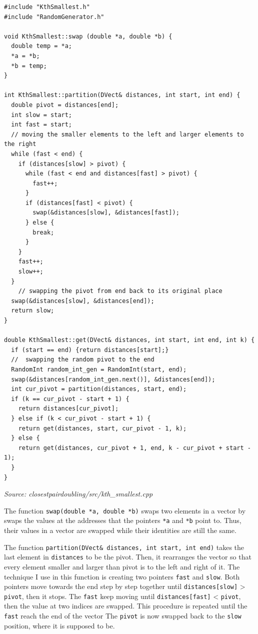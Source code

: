 \documentclass[12pt,english,]{article}
\newcommand{\code}[1]{\colorbox{light-gray}{\texttt{#1}}}
\begin{document}
\begin{lstlisting}
#include "KthSmallest.h"
#include "RandomGenerator.h"

void KthSmallest::swap (double *a, double *b) {
  double temp = *a;
  *a = *b;
  *b = temp;
}

int KthSmallest::partition(DVect& distances, int start, int end) {
  double pivot = distances[end];
  int slow = start;
  int fast = start;
  // moving the smaller elements to the left and larger elements to the right
  while (fast < end) {
    if (distances[slow] > pivot) {
      while (fast < end and distances[fast] > pivot) {
        fast++;
      }
      if (distances[fast] < pivot) {
        swap(&distances[slow], &distances[fast]);
      } else {
        break;
      }
    }
    fast++;
    slow++;
  }
    // swapping the pivot from end back to its original place
  swap(&distances[slow], &distances[end]);
  return slow;
}

double KthSmallest::get(DVect& distances, int start, int end, int k) {
  if (start == end) {return distances[start];}
  //  swapping the random pivot to the end
  RandomInt random_int_gen = RandomInt(start, end);
  swap(&distances[random_int_gen.next()], &distances[end]);
  int cur_pivot = partition(distances, start, end);
  if (k == cur_pivot - start + 1) {
    return distances[cur_pivot];
  } else if (k < cur_pivot - start + 1) {
    return get(distances, start, cur_pivot - 1, k);
  } else {
    return get(distances, cur_pivot + 1, end, k - cur_pivot + start - 1);
  }
}

\end{lstlisting}
\vspace{-9truemm}
\begin{minipage}{1\textwidth}
  \begin{flushright}
  {\footnotesize \emph{Source: closestpairdoubling/src/kth\_smallest.cpp}\par}
  \end{flushright}
\end{minipage}
\vspace{0.5truemm}

The function \code{swap(double *a, double *b)} swaps two elements in a
vector by swaps the values at the addresses that the pointers \code{*a}
and \code{*b} point to. Thus, their values in a vector are swapped while
their identities are still the same.

The function \code{partition(DVect\& distances, int start, int end)}
takes the last element in \code{distances} to be the pivot. Then, it
rearranges the vector so that every element smaller and larger than
pivot is to the left and right of it. The technique I use in this
function is creating two pointers \code{fast} and \code{slow}. Both
pointers move towards the end step by step together until
\code{distances[slow]} \textgreater{} \code{pivot}, then it stops. The
\code{fast} keep moving until \code{distances[fast]} \textless{}
\code{pivot}, then the value at two indices are swapped. This procedure
is repeated until the \code{fast} reach the end of the vector The
\code{pivot} is now swapped back to the \code{slow} position, where it
is supposed to be.
\end{document}
